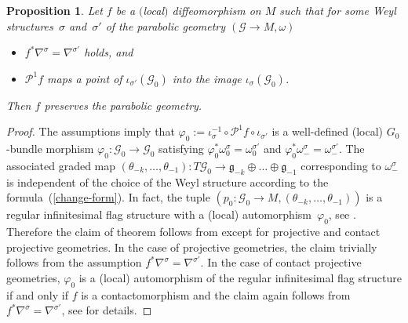 \documentclass[10pt,a4paper]{amsart}
\newcommand{\om}{\omega}
\newcommand{\si}{\sigma}
\newcommand{\ba}{\mathcal{G}}
\newcommand{\va}{\varphi}
\newcommand{\fg}{\mathfrak g}
\numberwithin{equation}{section}
\newtheorem{Proposition}[Theorem]{Proposition}
 { \theoremstyle{definition}
\newtheorem{Definition}[Theorem]{Definition}
\newtheorem{Example}[Theorem]{Example}
\newtheorem{Remark}[Theorem]{Remark} }
\begin{document}
\begin{Proposition} \label{auto}
Let $f$ be a $($local$)$ diffeomorphism on $M$ such that for some Weyl structu\-res~$\si$ and~$\si'$ of the parabolic geometry $(\ba\to M,\om)$
\begin{itemize}\itemsep=0pt
\item $f^*\nabla^{\si}=\nabla^{\si'}$ holds, and
\item $\mathcal{P}^1f$ maps a point of $\iota_{\si'}(\ba_0)$ into the image $\iota_{\si}(\ba_0)$.
\end{itemize}
Then $f$ preserves the parabolic geometry.
\end{Proposition}
\begin{proof}
The assumptions imply that $\va_0:= \iota_{\si}^{-1}\circ \mathcal{P}^1f\circ \iota_{\si'}$ is a well-def\/ined (local) $G_0$-bundle morphism $\va_0\colon \ba_0\to \ba_0$ satisfying $\va_0^*\om_{0}^\si=\om_{0}^{\si'}$ and $\va_0^*\om_-^\si=\om_-^{\si'}$. The associated graded map $(\theta_{-k},\dots,\theta_{-1})\colon T\ba_0\to \fg_{-k}\oplus \dots \oplus \fg_{-1}$ corresponding to $\om_-^\si$ is independent of the choice of the Weyl structure according to the formula~(\ref{change-form}). In fact, the tuple $(p_0\colon \ba_0\to M, (\theta_{-k},\dots,\theta_{-1}))$ is a regular inf\/initesimal f\/lag structure with a (local) automorphism~$\va_0$, see \cite[Section~3.1.6--3.1.8]{parabook}. Therefore the claim of theorem follows from \cite[Theorem~3.1.14]{parabook} except for projective and contact projective geometries. In the case of projective geometries, the claim trivially follows from the assumption $f^*\nabla^{\si}=\nabla^{\si'}$. In the case of contact projective geometries, $\va_0$ is a (local) automorphism of the regular inf\/initesimal f\/lag structure if and only if $f$ is a contactomorphism and the claim again follows from $f^*\nabla^{\si}=\nabla^{\si'}$, see \cite[Section 4.2]{parabook} for details.
\end{proof}
\end{document}

